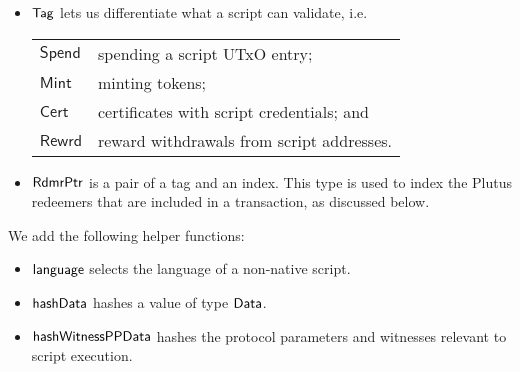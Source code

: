\begin{itemize}
  \item $\mathsf{Tag}$ lets us differentiate what a script
  can validate, i.e. \\
  \begin{tabular}{l@{~to validate~}l}
  $\mathsf{Spend}$ & spending a script UTxO entry; \\
  $\mathsf{Mint}$ & minting tokens; \\
  $\mathsf{Cert}$  & certificates with script credentials; and  \\
  $\mathsf{Rewrd}$ & reward withdrawals from script addresses.
  \end{tabular}

  \item $\mathsf{RdmrPtr}$ is a pair of a tag and an index. This type is
  used to index the Plutus redeemers that are included in a transaction, as discussed
  below.

\end{itemize}

We add the following helper functions:

\begin{itemize}
  \item $\mathsf{language}$ selects the language of a non-native script.
  \item $\mathsf{hashData}$ hashes a value of type $\mathsf{Data}$.
  \item $\mathsf{hashWitnessPPData}$ hashes the protocol parameters and witnesses relevant to script execution.
\end{itemize}

